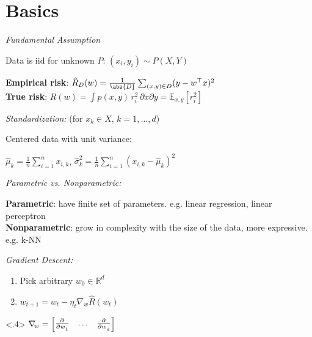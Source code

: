 \section{Basics}

\emph{Fundamental Assumption}

Data is iid for unknown $P$: $(x_i, y_i) \sim P(X,Y)$

\textbf{Empirical risk}: $\hat{R}_D(w) = \frac{1}{\abs{D}}\sum_{(x,y)\in D} (y-w^\top x)^2$ \\
\textbf{True risk}: $R(w) = \int p(x,y)\, r_i^2 \,\partial x\partial y = \mathbb{E}_{x,y}[r_i^2]$


\emph{Standardization:} \enskip
{\color{gray} (for $x_k\!\in\! X$, $k=1,\ldots,d$)}

Centered data with unit variance:

\vspace{-2pt}$\hat{\mu}_k = \frac{1}{n}\sum_{i=1}^n x_{i,k}$, \enskip $\hat{\sigma}_k^2 = \frac{1}{n}\sum_{i=1}^n {(x_{i,k}-\hat{\mu}_k)}^2$ 

\emph{Parametric vs. Nonparametric:}

\textbf{Parametric}: have finite set of parameters. 
e.g. linear regression, linear perceptron\\
\textbf{Nonparametric}: grow in complexity with the size of the data, more expressive.
e.g. k-NN

\emph{Gradient Descent:}

\begin{highlightbox}
    \begin{enumerate}
        \item Pick arbitrary $w_0 \in \mathbb{R}^d$
        \item $w_{t+1} = w_t - \eta_t \nabla\!_w \hat{R}(w_t)$
    \end{enumerate}
    
    \vspace*{-25pt}\hfill
    \begin{highlightbox*}<.4>
    	\footnotesize
    	$\nabla\!_w = \begin{bmatrix}
    		\pderiv{}{w_1} & \ldots & \pderiv{}{w_d}
    	\end{bmatrix}$
    \end{highlightbox*}
\end{highlightbox}

